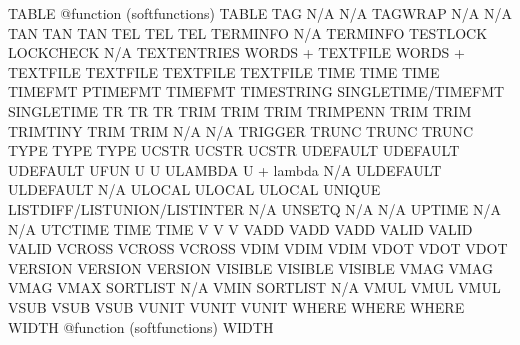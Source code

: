 \documentclass[letterpaper,10pt,english]{sphinxmanual}
\begin{document}
\begin{sphinxVerbatim}[commandchars=\\\{\}]
TABLE                   @function (softfunctions)    TABLE
TAG                     N/A                          N/A
TAGWRAP                 N/A                          N/A
TAN                     TAN                          TAN
TEL                     TEL                          TEL
TERMINFO                N/A                          TERMINFO
TESTLOCK                LOCKCHECK                    N/A
TEXTENTRIES             WORDS + TEXTFILE             WORDS + TEXTFILE
TEXTFILE                TEXTFILE                     TEXTFILE
TIME                    TIME                         TIME
TIMEFMT                 PTIMEFMT                     TIMEFMT
TIMESTRING              SINGLETIME/TIMEFMT           SINGLETIME
TR                      TR                           TR
TRIM                    TRIM                         TRIM
TRIMPENN                TRIM                         TRIM
TRIMTINY                TRIM                         TRIM
N/A                     N/A                          TRIGGER
TRUNC                   TRUNC                        TRUNC
TYPE                    TYPE                         TYPE
UCSTR                   UCSTR                        UCSTR
UDEFAULT                UDEFAULT                     UDEFAULT
UFUN                    U                            U
ULAMBDA                 U + \PYGZsh{}lambda                  N/A
ULDEFAULT               ULDEFAULT                    N/A
ULOCAL                  ULOCAL                       ULOCAL
UNIQUE                  LISTDIFF/LISTUNION/LISTINTER N/A
UNSETQ                  N/A                          N/A
UPTIME                  N/A                          N/A
UTCTIME                 TIME                         TIME
V                       V                            V
VADD                    VADD                         VADD
VALID                   VALID                        VALID
VCROSS                  VCROSS                       VCROSS
VDIM                    VDIM                         VDIM
VDOT                    VDOT                         VDOT
VERSION                 VERSION                      VERSION
VISIBLE                 VISIBLE                      VISIBLE
VMAG                    VMAG                         VMAG
VMAX                    SORTLIST                     N/A
VMIN                    SORTLIST                     N/A
VMUL                    VMUL                         VMUL
VSUB                    VSUB                         VSUB
VUNIT                   VUNIT                        VUNIT
WHERE                   WHERE                        WHERE
WIDTH                   @function (softfunctions)    WIDTH

\end{sphinxVerbatim}
\end{document}
